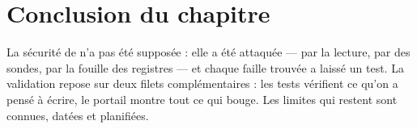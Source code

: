 \section*{Conclusion du chapitre}
La sécurité de \demo{} n'a pas été supposée : elle a été attaquée --- par la lecture, par des
sondes, par la fouille des registres --- et chaque faille trouvée a laissé un test. La
validation repose sur deux filets complémentaires : les tests vérifient ce qu'on a pensé à
écrire, le portail montre tout ce qui bouge. Les limites qui restent sont connues, datées et
planifiées.
